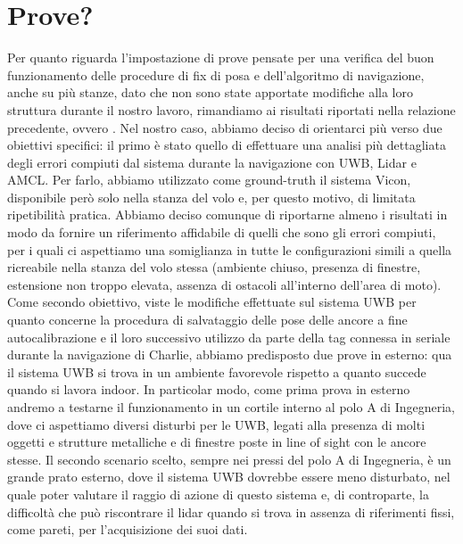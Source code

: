 \section{Prove?}
Per quanto riguarda l'impostazione di prove pensate per una verifica del buon funzionamento delle procedure di fix di posa e dell'algoritmo di navigazione, anche su più stanze, dato che non sono state apportate modifiche alla loro struttura durante il nostro lavoro, rimandiamo ai risultati riportati nella relazione precedente, ovvero \cite{ptvlocalizzazione}.
Nel nostro caso, abbiamo deciso di orientarci più verso due obiettivi specifici: il primo è stato quello di effettuare una analisi più dettagliata degli errori compiuti dal sistema durante la navigazione con UWB, Lidar e AMCL. Per farlo, abbiamo utilizzato come ground-truth il sistema Vicon, disponibile però solo nella stanza del volo e, per questo motivo, di limitata ripetibilità pratica. Abbiamo deciso comunque di riportarne almeno i risultati in modo da fornire un riferimento affidabile di quelli che sono gli errori compiuti, per i quali ci aspettiamo una somiglianza in tutte le configurazioni simili a quella ricreabile nella stanza del volo stessa (ambiente chiuso, presenza di finestre, estensione non troppo elevata, assenza di ostacoli all'interno dell'area di moto). Come secondo obiettivo, viste le modifiche effettuate sul sistema UWB per quanto concerne la procedura di salvataggio delle pose delle ancore a fine autocalibrazione e il loro successivo utilizzo da parte della tag connessa in seriale durante la navigazione di Charlie, abbiamo predisposto due prove in esterno: qua il sistema UWB si trova in un ambiente favorevole rispetto a quanto succede quando si lavora indoor. In particolar modo, come prima prova in esterno andremo a testarne il funzionamento in un cortile interno al polo A di Ingegneria, dove ci aspettiamo diversi disturbi per le UWB, legati alla presenza di molti oggetti e strutture metalliche e di finestre poste in line of sight con le ancore stesse. Il secondo scenario scelto, sempre nei pressi del polo A di Ingegneria, è un grande prato esterno, dove il sistema UWB dovrebbe essere meno disturbato, nel quale poter valutare il raggio di azione di questo sistema e, di controparte, la difficoltà che può riscontrare il lidar quando si trova in assenza di riferimenti fissi, come pareti, per l'acquisizione dei suoi dati.

